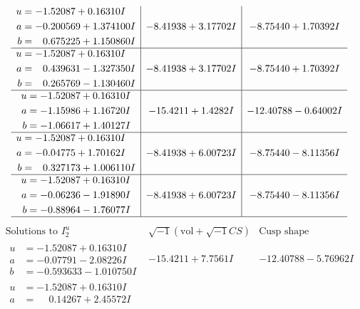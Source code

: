 \documentclass[1p]{elsarticle_modified}
\theoremstyle{definition}
\newcommand{\I}{\sqrt{-1}}
\begin{document}
$$\begin{array}{c|c|c}
\begin{aligned}
u &= -1.52087 + 0.16310 I \\
a &= -0.200569 + 1.374100 I \\
b &= \phantom{-}0.675225 + 1.150860 I\end{aligned}
 & -8.41938 + 3.17702 I & -8.75440 + 1.70392 I \\ \hline\begin{aligned}
u &= -1.52087 + 0.16310 I \\
a &= \phantom{-}0.439631 - 1.327350 I \\
b &= \phantom{-}0.265769 - 1.130460 I\end{aligned}
 & -8.41938 + 3.17702 I & -8.75440 + 1.70392 I \\ \hline\begin{aligned}
u &= -1.52087 + 0.16310 I \\
a &= -1.15986 + 1.16720 I \\
b &= -1.06617 + 1.40127 I\end{aligned}
 & -15.4211 + 1.4282 I & -12.40788 - 0.64002 I \\ \hline\begin{aligned}
u &= -1.52087 + 0.16310 I \\
a &= -0.04775 + 1.70162 I \\
b &= \phantom{-}0.327173 + 1.006110 I\end{aligned}
 & -8.41938 + 6.00723 I & -8.75440 - 8.11356 I \\ \hline\begin{aligned}
u &= -1.52087 + 0.16310 I \\
a &= -0.06236 - 1.91890 I \\
b &= -0.88964 - 1.76077 I\end{aligned}
 & -8.41938 + 6.00723 I & -8.75440 - 8.11356 I\\
 \hline 
 \end{array}$$\newpage$$\begin{array}{c|c|c}  
\text{Solutions to }I^u_{2}& \I (\text{vol} + \sqrt{-1}CS) & \text{Cusp shape}\\
 \hline 
\begin{aligned}
u &= -1.52087 + 0.16310 I \\
a &= -0.07791 - 2.08226 I \\
b &= -0.593633 - 1.010750 I\end{aligned}
 & -15.4211 + 7.7561 I & -12.40788 - 5.76962 I \\ \hline\begin{aligned}
u &= -1.52087 + 0.16310 I \\
a &= \phantom{-}0.14267 + 2.45572 I \\

\end{aligned}
\end{array}$$
\end{document}
